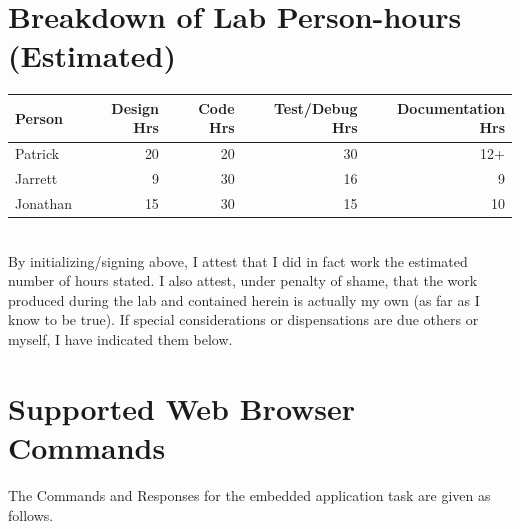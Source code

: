 \documentclass[12pt]{article} %
\begin{document}
    \pagebreak
    \appendix

    \section{Breakdown of Lab Person-hours (Estimated)}

    \begin{tabular}{|l|*{4}{r|}}
      \hline
      Person & Design Hrs & Code Hrs & Test/Debug Hrs & Documentation Hrs \\ \hline
      Patrick & 20 & 20 & 30 & 12+  \\ \hline
			Jarrett & 9 & 30 & 16 & 9 \\ \hline
      Jonathan & 15 & 30 & 15 & 10  \\ \hline
    \end{tabular}

    ~\\

    By initializing/signing above, I attest that I did in fact work the
    estimated number of hours stated. I also attest, under penalty of shame,
    that the work produced during the lab and contained herein is actually my
    own (as far as I know to be true). If special considerations or
    dispensations are due others or myself, I have indicated them below.

    \pagebreak

		\section{Supported Web Browser Commands}
        \label{appendix:commands}

		The Commands and Responses for the embedded application task are given as follows. 
\end{document}
